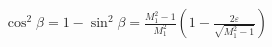 \documentclass[10pt]{article}
\begin{document}
\begin{align*}\cos^2 \beta 
= 1 - \sin^2 \beta 
= \frac{M_{1}^{2}-1}{M_{1}^{2}} 
\left( 
1 - \frac{2 \varepsilon}{ \sqrt{M_{1}^{2} - 1} }
\right)\end{align*}
\end{document}
